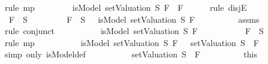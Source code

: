 \begin{isabellebody}
\ {\isacharparenleft}rule\ mp{\isacharparenright}\isanewline
\ \ \ \ \isamarkupfalse%
\ \isamarkupfalse%
\ {\isachardoublequoteopen}{\isasymnot}\ isModel\ {\isacharparenleft}setValuation\ S{\isacharparenright}\ {\isacharparenleft}F{}\ \isactrlbold {\isasymand}\ F{}{\isacharparenright}{\isachardoublequoteclose}\isanewline
\ \ \ \ \isamarkupfalse%
\ {\isacharparenleft}rule\ disjE{\isacharparenright}\isanewline
\ \ \ \ \ \ \isamarkupfalse%
\ {\isachardoublequoteopen}\isactrlbold {\isasymnot}\ F{}\ {\isasymin}\ S{\isachardoublequoteclose}\isanewline
\ \ \ \ \ \ \isamarkupfalse%
\ {\isachardoublequoteopen}\isactrlbold {\isasymnot}\ F{}\ {\isasymin}\ S\ {\isasymlongrightarrow}\ {\isasymnot}\ isModel\ {\isacharparenleft}setValuation\ S{\isacharparenright}\ F{}{\isachardoublequoteclose}\isanewline
\ \ \ \ \ \ \ \ \isamarkupfalse%
\ assms{\isacharparenleft}{}{\isacharparenright}\ \isamarkupfalse%
\ {\isacharparenleft}rule\ conjunct{}{\isacharparenright}\isanewline
\ \ \ \ \ \ \isamarkupfalse%
\ \isamarkupfalse%
\ {\isachardoublequoteopen}{\isasymnot}\ isModel\ {\isacharparenleft}setValuation\ S{\isacharparenright}\ F{}{\isachardoublequoteclose}\isanewline
\ \ \ \ \ \ \ \ \isamarkupfalse%
\ {\isacartoucheopen}\isactrlbold {\isasymnot}\ F{}\ {\isasymin}\ S{\isacartoucheclose}\ \isamarkupfalse%
\ {\isacharparenleft}rule\ mp{\isacharparenright}\isanewline
\ \ \ \ \ \ \isamarkupfalse%
\ \isamarkupfalse%
\ {\isachardoublequoteopen}{\isacharparenleft}{\isasymnot}\ isModel\ {\isacharparenleft}setValuation\ S{\isacharparenright}\ F{}{\isacharparenright}\ {\isacharequal}\ {\isacharparenleft}{\isasymnot}\ {\isacharparenleft}setValuation\ S{\isacharparenright}\ {\isasymTurnstile}\ F{}{\isacharparenright}{\isachardoublequoteclose}\isanewline
\ \ \ \ \ \ \ \ \isamarkupfalse%
\ {\isacharparenleft}simp\ only{\isacharcolon}\ isModel{\isacharunderscore}def{\isacharparenright}\isanewline
\ \ \ \ \ \ \isamarkupfalse%
\ \isamarkupfalse%
\ {\isachardoublequoteopen}{\isasymnot}\ {\isacharparenleft}setValuation\ S{\isacharparenright}\ {\isasymTurnstile}\ F{}{\isachardoublequoteclose}\isanewline
\ \ \ \ \ \ \ \ \isamarkupfalse%
\ this\isanewline
\ \ \ \ \ \ \isamarkupfalse%

\end{isabellebody}

